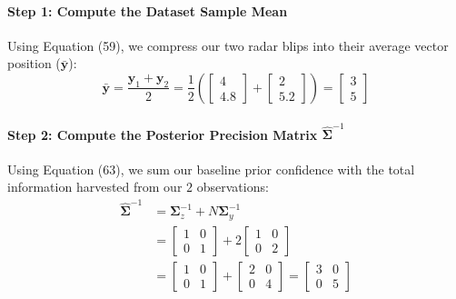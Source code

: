 \documentclass{article}
\begin{document}
\paragraph{Step 1: Compute the Dataset Sample Mean}
Using Equation (59), we compress our two radar blips into their average vector position ($\bar{\mathbf{y}}$):
\begin{equation}
\bar{\mathbf{y}} = \frac{\mathbf{y}_1 + \mathbf{y}_2}{2} = \frac{1}{2} \left( \begin{bmatrix} 4 \\ 4.8 \end{bmatrix} + \begin{bmatrix} 2 \\ 5.2 \end{bmatrix} \right) = \begin{bmatrix} 3 \\ 5 \end{bmatrix} \tag{65}
\end{equation}

\paragraph{Step 2: Compute the Posterior Precision Matrix $\hat{\boldsymbol{\Sigma}}^{-1}$}
Using Equation (63), we sum our baseline prior confidence with the total information harvested from our $2$ observations:
\begin{align}
\hat{\boldsymbol{\Sigma}}^{-1} &= \boldsymbol{\Sigma}_z^{-1} + N\boldsymbol{\Sigma}_y^{-1} \nonumber \\
&= \begin{bmatrix} 1 & 0 \\ 0 & 1 \end{bmatrix} + 2\begin{bmatrix} 1 & 0 \\ 0 & 2 \end{bmatrix} \nonumber \\
&= \begin{bmatrix} 1 & 0 \\ 0 & 1 \end{bmatrix} + \begin{bmatrix} 2 & 0 \\ 0 & 4 \end{bmatrix} = \begin{bmatrix} 3 & 0 \\ 0 & 5 \end{bmatrix} \tag{66}
\end{align}
\end{document}
